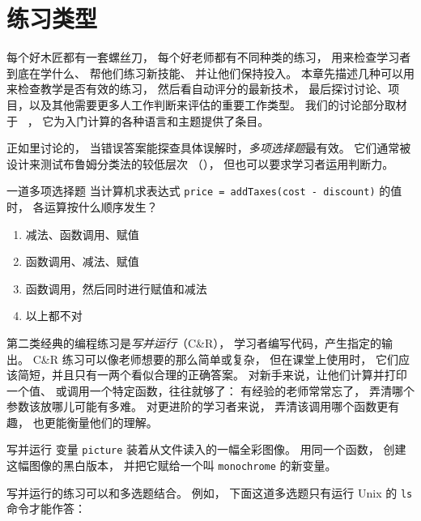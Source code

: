 \chapter{练习类型}\label{s:exercises}

每个好木匠都有一套螺丝刀，
每个好老师都有不同种类的练习，
用来检查学习者到底在学什么、
帮他们练习新技能、
并让他们保持投入。
本章先描述几种可以用来检查教学是否有效的练习，
然后看自动评分的最新技术，
最后探讨讨论、项目，以及其他需要更多人工作判断来评估的重要工作类型。
我们的讨论部分取材于
~\cite{Sand2013}，
它为入门计算的各种语言和主题提供了条目。


正如里讨论的，
当错误答案能探查具体误解时，\emph{多项选择题}最有效。
它们通常被设计来测试布鲁姆分类法的较低层次
（），
但也可以要求学习者运用判断力。

\begin{aside}{一道多项选择题}
  当计算机求表达式 \texttt{price\ =\ addTaxes(cost\ -\ discount)} 的值时，
  各运算按什么顺序发生？
  \begin{enumerate}
  \item
    减法、函数调用、赋值
  \item
    函数调用、减法、赋值
  \item
    函数调用，然后同时进行赋值和减法
  \item
    以上都不对
  \end{enumerate}
\end{aside}

第二类经典的编程练习是\emph{写并运行}（C\&R），
学习者编写代码，产生指定的输出。
C\&R 练习可以像老师想要的那么简单或复杂，
但在课堂上使用时，
它们应该简短，并且只有一两个看似合理的正确答案。
对新手来说，让他们计算并打印一个值、
或调用一个特定函数，往往就够了：
有经验的老师常常忘了，
弄清哪个参数该放哪儿可能有多难。
对更进阶的学习者来说，
弄清该调用哪个函数更有趣，
也更能衡量他们的理解。

\begin{aside}{写并运行}
  变量 \texttt{picture} 装着从文件读入的一幅全彩图像。
  用同一个函数，
  创建这幅图像的黑白版本，
  并把它赋给一个叫 \texttt{monochrome} 的新变量。
\end{aside}

写并运行的练习可以和多选题结合。
例如，
下面这道多选题只有运行 Unix 的 \texttt{ls} 命令才能作答：

